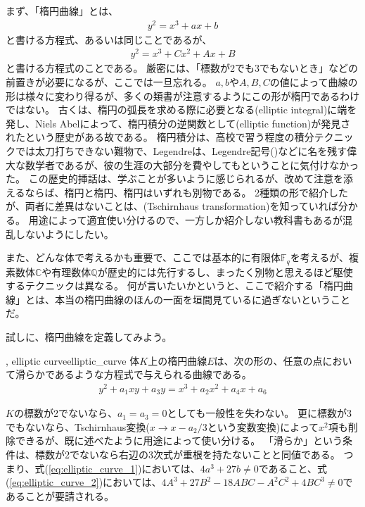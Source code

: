 まず、「楕円曲線」とは、
\begin{align}
\label{eq:elliptic_curve_1}
y^2 = x^3 + ax + b
\end{align}
と書ける方程式、あるいは同じことであるが、
\begin{align}
\label{eq:elliptic_curve_2}
y^2 = x^3 + Cx^2 + Ax + B
\end{align}
と書ける方程式のことである。
厳密には、「標数が2でも3でもないとき」などの前置きが必要になるが、ここでは一旦忘れる。
$a,b$や$A,B,C$の値によって曲線の形は様々に変わり得るが、多くの類書が注意するようにこの形が楕円であるわけではない。
古くは、楕円の弧長を求める際に必要となる(elliptic integral)に端を発し、Niels Abelによって、楕円積分の逆関数として(elliptic function)が発見されたという歴史がある故である。
楕円積分は、高校で習う程度の積分テクニックでは太刀打ちできない難物で、Legendreは、Legendre記号()などに名を残す偉大な数学者であるが、彼の生涯の大部分を費やしてもということに気付けなかった。
この歴史的挿話は、学ぶことが多いように感じられるが、改めて注意を添えるならば、楕円と楕円、楕円はいずれも別物である。
2種類の形で紹介したが、両者に差異はないことは、(Tschirnhaus transformation)を知っていれば分かる。
用途によって適宜使い分けるので、一方しか紹介しない教科書もあるが混乱しないようにしたい。

また、どんな体で考えるかも重要で、ここでは基本的に有限体$\mathbb{F}_q$を考えるが、複素数体$\mathbb{C}$や有理数体$\mathbb{Q}$が歴史的には先行するし、まったく別物と思えるほど駆使するテクニックは異なる。
何が言いたいかというと、ここで紹介する「楕円曲線」とは、本当の楕円曲線のほんの一面を垣間見ているに過ぎないということだ。

試しに、楕円曲線を定義してみよう。

\begin{Defi}{, elliptic curve}{elliptic_curve}
体$K$上の楕円曲線$E$は、次の形の、任意の点において滑らかであるような方程式で与えられる曲線である。
\begin{align*}
y^2 + a_1xy + a_3y = x^3 + a_2x^2 + a_4x + a_6
\end{align*}
\end{Defi}

$K$の標数が2でないなら、$a_1 = a_3 = 0$としても一般性を失わない。
更に標数が3でもないなら、Tschirnhaus変換($x\to x-a_2/3$という変数変換)によって$x^2$項も削除できるが、既に述べたように用途によって使い分ける。
「滑らか」という条件は、標数が2でないなら右辺の3次式が重根を持たないことと同値である。
つまり、式(\ref{eq:elliptic_curve_1})においては、$4a^3+27b\neq0$であること、式(\ref{eq:elliptic_curve_2})においては、$4A^3+27B^2-18ABC-A^2C^2 + 4BC^3\neq0$であることが要請される。

